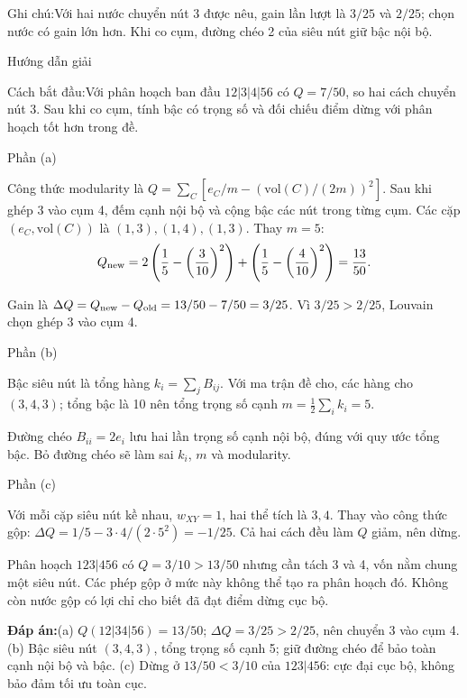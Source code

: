 \documentclass[10pt,a4paper,twocolumn]{article}
\makeatletter
\newcommand{\maptag}[1]{\phantomsection\@bsphack\protected@write\@auxout{}{\string\newlabel{#1}{{}{\thepage}{}{\@currentHref}{}}}\@esphack}
\newcommand{\key}[1]{#1:\enspace}
\newcommand{\solutionprompt}[1]{\par\addvspace{1pt}\noindent\key{Cách bắt đầu}#1\par\addvspace{2pt}}
\newcommand{\examnote}[1]{\par\addvspace{2pt}\noindent\key{Ghi chú}#1\par\addvspace{3pt}}
\newcommand{\blocklabel}[1]{\par\noindent#1\par\nobreak}
\newcommand{\answer}[1]{%
  \par\addvspace{3pt}%
  \blocklabel{#1Hướng dẫn giải}}
\newcommand{\finalanswer}[1]{%
  \par\addvspace{3pt}\noindent\textbf{Đáp án:}\nobreak\enspace#1\par}
\newcommand{\guidepart}[1]{%
  \par\addvspace{1.5pt}%
  \blocklabel{Phần #1}}
\makeatother
\begin{document}
\examnote{Với hai nước chuyển nút 3 được nêu, gain lần lượt là $3/25$ và $2/25$; chọn nước có gain lớn hơn. Khi co cụm, đường chéo 2 của siêu nút giữ bậc nội bộ.}
\answer{\maptag{answer:Pr20}}
\solutionprompt{Với phân hoạch ban đầu $12|3|4|56$ có $Q=7/50$, so hai cách chuyển nút 3. Sau khi co cụm, tính bậc có trọng số và đối chiếu điểm dừng với phân hoạch tốt hơn trong đề.}
\guidepart{(a)}
\begin{guidesteps}
\item Công thức modularity là $Q=\sum_C[e_C/m-(\mathrm{vol}(C)/(2m))^2]$. Sau khi ghép 3 vào cụm 4, đếm cạnh nội bộ và cộng bậc các nút trong từng cụm. Các cặp $(e_C,\mathrm{vol}(C))$ là $(1,3),(1,4),(1,3)$. Thay $m=5$:
\[
Q_{\rm new}=2\left(\frac15-\left(\frac3{10}\right)^2\right)
+\left(\frac15-\left(\frac4{10}\right)^2\right)=\frac{13}{50}.
\]
\item Gain là $\Delta Q=Q_{\rm new}-Q_{\rm old}=13/50-7/50=3/25$. Vì $3/25>2/25$, Louvain chọn ghép 3 vào cụm 4.
\end{guidesteps}
\guidepart{(b)}
\begin{guidesteps}
\item Bậc siêu nút là tổng hàng $k_i=\sum_jB_{ij}$. Với ma trận đề cho, các hàng cho $(3,4,3)$; tổng bậc là 10 nên tổng trọng số cạnh $m=\frac12\sum_i k_i=5$.
\item Đường chéo $B_{ii}=2e_i$ lưu hai lần trọng số cạnh nội bộ, đúng với quy ước tổng bậc. Bỏ đường chéo sẽ làm sai $k_i$, $m$ và modularity.
\end{guidesteps}
\guidepart{(c)}
\begin{guidesteps}
\item Với mỗi cặp siêu nút kề nhau, $w_{XY}=1$, hai thể tích là $3,4$. Thay vào công thức gộp: $\Delta Q=1/5-3\cdot4/(2\cdot5^2)=-1/25$. Cả hai cách đều làm $Q$ giảm, nên dừng.
\item Phân hoạch $123|456$ có $Q=3/10>13/50$ nhưng cần tách 3 và 4, vốn nằm chung một siêu nút. Các phép gộp ở mức này không thể tạo ra phân hoạch đó. Không còn nước gộp có lợi chỉ cho biết đã đạt điểm dừng cục bộ.
\end{guidesteps}
\finalanswer{(a) $Q(12|34|56)=13/50$; $\Delta Q=3/25>2/25$, nên chuyển 3 vào cụm 4. (b) Bậc siêu nút $(3,4,3)$, tổng trọng số cạnh 5; giữ đường chéo để bảo toàn cạnh nội bộ và bậc. (c) Dừng ở $13/50<3/10$ của $123|456$: cực đại cục bộ, không bảo đảm tối ưu toàn cục.}
\end{document}

